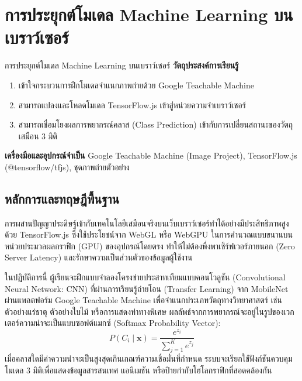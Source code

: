 
\chapter{การประยุกต์โมเดล Machine Learning บนเบราว์เซอร์}
\label{ch:lab05}


\vspace{0.4cm}

\begin{labobjectivebox}{การประยุกต์โมเดล Machine Learning บนเบราว์เซอร์}
\textbf{วัตถุประสงค์การเรียนรู้}
\begin{enumerate}[leftmargin=1.8cm, itemsep=2pt]
    \item เข้าใจกระบวนการฝึกโมเดลจำแนกภาพถ่ายด้วย Google Teachable Machine
    \item สามารถแปลงและโหลดโมเดล TensorFlow.js เข้าสู่หน่วยความจำเบราว์เซอร์
    \item สามารถเชื่อมโยงผลการพยากรณ์คลาส (Class Prediction) เข้ากับการเปลี่ยนสถานะของวัตถุเสมือน 3 มิติ
\end{enumerate}

\vspace{4pt}
\textbf{เครื่องมือและอุปกรณ์จำเป็น} \enspace Google Teachable Machine (Image Project), TensorFlow.js (@tensorflow/tfjs), ชุดภาพถ่ายตัวอย่าง
\end{labobjectivebox}

\section{หลักการและทฤษฎีพื้นฐาน}

การผสานปัญญาประดิษฐ์เข้ากับเทคโนโลยีเสมือนจริงบนเว็บเบราว์เซอร์ทำได้อย่างมีประสิทธิภาพสูงด้วย TensorFlow.js ซึ่งใช้ประโยชน์จาก WebGL หรือ WebGPU ในการคำนวณแบบขนานบนหน่วยประมวลผลกราฟิก (GPU) ของอุปกรณ์โดยตรง ทำให้ไม่ต้องพึ่งพาเซิร์ฟเวอร์ภายนอก (Zero Server Latency) และรักษาความเป็นส่วนตัวของข้อมูลผู้ใช้งาน

ในปฏิบัติการนี้ ผู้เรียนจะฝึกแบบจำลองโครงข่ายประสาทเทียมแบบคอนโวลูชัน (Convolutional Neural Network: CNN) ที่ผ่านการเรียนรู้ถ่ายโอน (Transfer Learning) จาก MobileNet ผ่านแพลตฟอร์ม Google Teachable Machine เพื่อจำแนกประเภทวัตถุทางวิทยาศาสตร์ เช่น ตัวอย่างแร่ธาตุ ตัวอย่างใบไม้ หรือการแสดงท่าทางพิเศษ ผลลัพธ์จากการพยากรณ์จะอยู่ในรูปของเวกเตอร์ความน่าจะเป็นแบบซอฟต์แมกซ์ (Softmax Probability Vector):
\begin{equation}
P(C_i \mid \mathbf{x}) = \frac{e^{z_i}}{\sum_{j=1}^{K} e^{z_j}}
\end{equation}
เมื่อคลาสใดมีค่าความน่าจะเป็นสูงสุดเกินเกณฑ์ความเชื่อมั่นที่กำหนด ระบบจะเรียกใช้ฟังก์ชันควบคุมโมเดล 3 มิติเพื่อแสดงข้อมูลสารสนเทศ แอนิเมชัน หรือป้ายกำกับโฮโลกราฟิกที่สอดคล้องกัน

